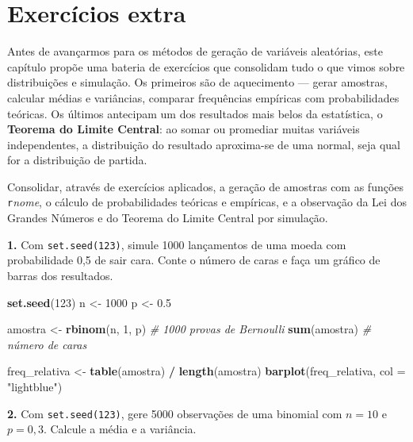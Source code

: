 \documentclass[
  portuguese,
  11pt,
  openany]{book}
\newenvironment{Shaded}{\begin{snugshade}}{\end{snugshade}}
\newcommand{\AttributeTok}[1]{\textcolor[rgb]{0.13,0.29,0.53}{#1}}
\newcommand{\CommentTok}[1]{\textcolor[rgb]{0.56,0.35,0.01}{\textit{#1}}}
\newcommand{\DecValTok}[1]{\textcolor[rgb]{0.00,0.00,0.81}{#1}}
\newcommand{\FloatTok}[1]{\textcolor[rgb]{0.00,0.00,0.81}{#1}}
\newcommand{\FunctionTok}[1]{\textcolor[rgb]{0.13,0.29,0.53}{\textbf{#1}}}
\newcommand{\NormalTok}[1]{#1}
\newcommand{\OtherTok}[1]{\textcolor[rgb]{0.56,0.35,0.01}{#1}}
\newcommand{\SpecialCharTok}[1]{\textcolor[rgb]{0.81,0.36,0.00}{\textbf{#1}}}
\newcommand{\StringTok}[1]{\textcolor[rgb]{0.31,0.60,0.02}{#1}}
\begin{document}
\chapter{Exercícios extra}\label{exercicios-extra}

Antes de avançarmos para os métodos de geração de variáveis aleatórias, este capítulo
propõe uma bateria de exercícios que consolidam tudo o que vimos sobre distribuições e
simulação. Os primeiros são de aquecimento --- gerar amostras, calcular médias e
variâncias, comparar frequências empíricas com probabilidades teóricas. Os últimos
antecipam um dos resultados mais belos da estatística, o \textbf{Teorema do Limite Central}:
ao somar ou promediar muitas variáveis independentes, a distribuição do resultado
aproxima-se de uma normal, seja qual for a distribuição de partida.

Consolidar, através de exercícios aplicados, a geração de amostras com as funções
\texttt{r}\emph{nome}, o cálculo de probabilidades teóricas e empíricas, e a observação da Lei dos
Grandes Números e do Teorema do Limite Central por simulação.

\textbf{1.} Com \texttt{set.seed(123)}, simule 1000 lançamentos de uma moeda com probabilidade 0,5
de sair cara. Conte o número de caras e faça um gráfico de barras dos resultados.

\begin{Shaded}
\begin{Highlighting}[]
\FunctionTok{set.seed}\NormalTok{(}\DecValTok{123}\NormalTok{)}
\NormalTok{n }\OtherTok{\textless{}{-}} \DecValTok{1000}
\NormalTok{p }\OtherTok{\textless{}{-}} \FloatTok{0.5}

\NormalTok{amostra }\OtherTok{\textless{}{-}} \FunctionTok{rbinom}\NormalTok{(n, }\DecValTok{1}\NormalTok{, p)      }\CommentTok{\# 1000 provas de Bernoulli}
\FunctionTok{sum}\NormalTok{(amostra)                    }\CommentTok{\# número de caras}

\NormalTok{freq\_relativa }\OtherTok{\textless{}{-}} \FunctionTok{table}\NormalTok{(amostra) }\SpecialCharTok{/} \FunctionTok{length}\NormalTok{(amostra)}
\FunctionTok{barplot}\NormalTok{(freq\_relativa, }\AttributeTok{col =} \StringTok{"lightblue"}\NormalTok{)}
\end{Highlighting}
\end{Shaded}

\textbf{2.} Com \texttt{set.seed(123)}, gere 5000 observações de uma binomial com \(n = 10\) e
\(p = 0{,}3\). Calcule a média e a variância.
\end{document}
